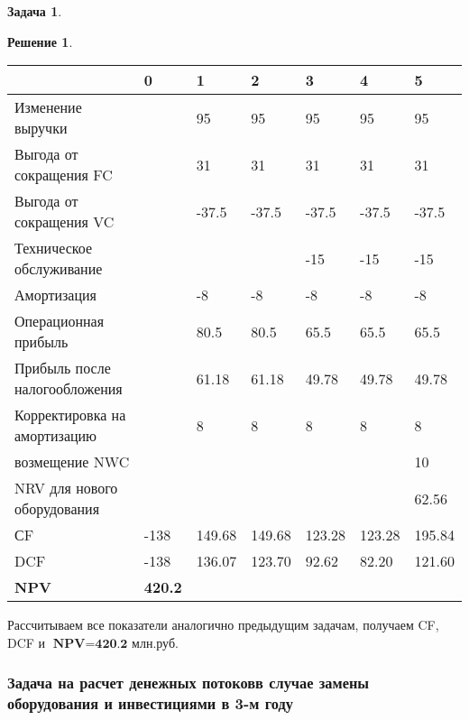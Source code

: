 \documentclass[a4paper, 14pt]{article}
\theoremstyle{plain} %
\theoremstyle{definition} %
\newtheorem*{solution}{Решение}
\newtheorem{problem}{Задача}[subsection]
\theoremstyle{remark} %
\begin{document}
\begin{problem}
\begin{solution}
\vspace{0.4em}
\begin{tabular}{|l|l|l|l|l|l|l|}
\hline
                              & \textbf{0}      & \textbf{1}      & \textbf{2}      & \textbf{3}      & \textbf{4}      & \textbf{5}       \\
\hline
Изменение выручки             &        & 95     & 95     & 95     & 95     & 95      \\
\hline
Выгода от сокращения FC       &        & 31     & 31     & 31     & 31     & 31      \\
\hline
Выгода от сокращения VC       &        & -37.5  & -37.5  & -37.5  & -37.5  & -37.5   \\
\hline
Техническое обслуживание      &        &        &        & -15    & -15    & -15     \\
\hline
Амортизация                   &        & -8     & -8     & -8     & -8     & -8      \\
\hline
Операционная прибыль          &        & 80.5   & 80.5   & 65.5   & 65.5   & 65.5    \\
\hline
Прибыль после налогообложения &        & 61.18  & 61.18  & 49.78  & 49.78  & 49.78   \\
\hline
Корректировка на амортизацию  &        & 8      & 8      & 8      & 8      & 8       \\
\hline
возмещение NWC                &        &        &        &        &        & 10      \\
\hline
NRV для нового оборудования   &        &        &        &        &        & 62.56   \\
\hline
СF                            & -138       & 149.68 & 149.68 & 123.28 & 123.28 & 195.84  \\
\hline
DCF                           & -138       & 136.07 & 123.70 & 92.62 & 82.20 & 121.60  \\
\hline
\textbf{NPV}                           & \textbf{420.2} &        &        &        &        &         \\
\hline
\end{tabular}

\vspace{0.4em}
Рассчитываем все показатели аналогично предыдущим задачам, получаем CF, DCF и $\textbf{NPV} = \textbf{420.2 млн.руб.}$
    \end{solution}
\end{problem}

\subsubsection{Задача  на  расчет денежных  потоковв  случае  замены  оборудования  и инвестициями в 3-м году}
\end{document}
